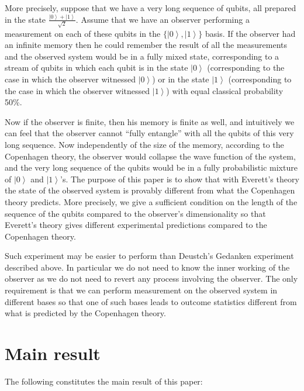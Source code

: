 \documentclass[11pt,amsmath,amssymb,latexsym,a4paper]{article}
\newcommand{\ket}[1]{\left|{#1}\right>}
\newcommand{\highlight}[1] {#1}
\begin{document}
More precisely, suppose that we have a very long sequence of qubits, all prepared in the state $\frac{\ket{0}+\ket{1}}{\sqrt{2}}$. Assume that we have an observer performing a measurement on each of these qubits in the $\{\ket{0},\ket{1}\}$ basis. If the observer had an infinite memory then he could remember the result of all the measurements and the observed system would be in a fully mixed state, corresponding to a stream of qubits in which each qubit is in the state $\ket{0}$ (corresponding to the case in which the observer witnessed $\ket{0}$) or in the state $\ket{1}$ (corresponding to the case in which the observer witnessed $\ket{1}$) with equal classical probability 50\%.     

Now if the observer is finite, then his memory is finite as well, and intuitively we can feel that the observer cannot ``fully entangle'' with all the qubits of this very long sequence. Now independently of the size of the memory, according to the Copenhagen theory, the observer would collapse the wave function of the system, and the very long sequence of the qubits would be in a fully probabilistic mixture of $\ket{0}$ and $\ket{1}$'s. The purpose of this paper is to show that with Everett's theory the state of the observed system is provably different from what the Copenhagen theory predicts. More precisely, we give a sufficient condition on the length of the sequence of the qubits compared to the observer's dimensionality so that Everett's theory gives different experimental predictions compared to the Copenhagen theory.

Such experiment \highlight{may be} easier to perform than Deustch's Gedanken experiment described above. In particular we do not need to know the inner working of the observer as we do not need to revert any process involving the observer. The only requirement is that we can perform measurement on the observed system in different bases so that one of such bases leads to outcome statistics different from what is predicted by the Copenhagen theory.



\section{Main result}


The following constitutes the main result of this paper:
\end{document}
